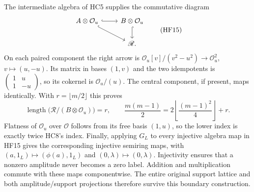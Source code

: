 \documentclass[11pt,a4paper]{article}
\theoremstyle{definition}\newtheorem{definition}[theorem]{Definition}
\begin{document}
The intermediate algebra of HC5 supplies the commutative diagram
\[
 \begin{tikzcd}
 A\otimes\mathcal O_u\arrow[r,hook]\arrow[dr,hook]&
 B\otimes\mathcal O_u\arrow[d,hook]\\
 &\mathscr R.
 \end{tikzcd}
 \tag{HF15}
\]
On each paired component the right arrow is
$\mathcal O_u[v]/(v^2-u^2)\to\mathcal O_u^2$,
$v\mapsto(u,-u)$. Its matrix in bases $(1,v)$ and the two
idempotents is $\left(\begin{smallmatrix}1&u\\1&-u\end{smallmatrix}\right)$,
so its cokernel is $\mathcal O_u/(u)$. The central component,
if present, maps identically. With $r=\lfloor m/2\rfloor$ this proves
\[
 \operatorname{length}\bigl(\mathscr R/(B\otimes\mathcal O_u)\bigr)=r,
 \qquad \frac{m(m-1)}2
     =2\left\lfloor\frac{(m-1)^2}{4}\right\rfloor+r.
 \tag{HF16}
\]
Flatness of $\mathcal O_u$ over $\mathcal O$ follows from its free
basis $(1,u)$, so the lower index is exactly twice HC8's index.
Finally, applying $G_L$ to every injective algebra map in HF15
gives the corresponding injective semiring maps, with
$(a,1_L)\mapsto(\phi(a),1_L)$ and $(0,\lambda)\mapsto(0,\lambda)$.
Injectivity ensures that a nonzero amplitude never becomes a zero
label. Addition and multiplication commute with these maps
componentwise. The entire original support lattice and both
amplitude/support projections therefore survive this boundary
construction.
\end{document}
